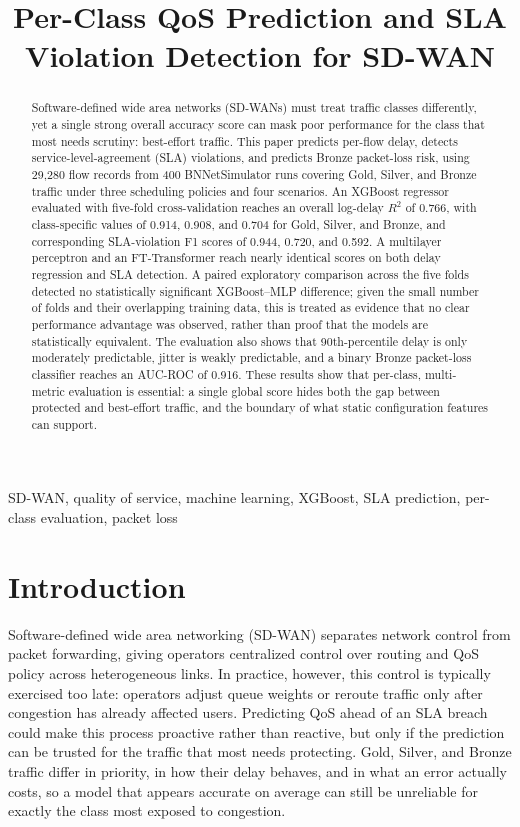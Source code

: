 \documentclass[conference]{IEEEtran}
\title{Per-Class QoS Prediction and SLA Violation Detection for SD-WAN}
\author{\IEEEauthorblockN{Radhika (Rishiv) Shitlani}
\IEEEauthorblockA{School of Computer Science\\
University of Galway, Galway, Ireland}}
\begin{document}
\maketitle

\begin{abstract}
Software-defined wide area networks (SD-WANs) must treat traffic classes differently, yet a single strong overall accuracy score can mask poor performance for the class that most needs scrutiny: best-effort traffic. This paper predicts per-flow delay, detects service-level-agreement (SLA) violations, and predicts Bronze packet-loss risk, using 29,280 flow records from 400 BNNetSimulator runs covering Gold, Silver, and Bronze traffic under three scheduling policies and four scenarios. An XGBoost regressor evaluated with five-fold cross-validation reaches an overall log-delay $R^2$ of 0.766, with class-specific values of 0.914, 0.908, and 0.704 for Gold, Silver, and Bronze, and corresponding SLA-violation F1 scores of 0.944, 0.720, and 0.592. A multilayer perceptron and an FT-Transformer reach nearly identical scores on both delay regression and SLA detection. A paired exploratory comparison across the five folds detected no statistically significant XGBoost--MLP difference; given the small number of folds and their overlapping training data, this is treated as evidence that no clear performance advantage was observed, rather than proof that the models are statistically equivalent. The evaluation also shows that 90th-percentile delay is only moderately predictable, jitter is weakly predictable, and a binary Bronze packet-loss classifier reaches an AUC-ROC of 0.916. These results show that per-class, multi-metric evaluation is essential: a single global score hides both the gap between protected and best-effort traffic, and the boundary of what static configuration features can support.
\end{abstract}

\begin{IEEEkeywords}
SD-WAN, quality of service, machine learning, XGBoost, SLA prediction, per-class evaluation, packet loss
\end{IEEEkeywords}

\section{Introduction}

Software-defined wide area networking (SD-WAN) separates network control from packet forwarding, giving operators centralized control over routing and QoS policy across heterogeneous links. In practice, however, this control is typically exercised too late: operators adjust queue weights or reroute traffic only after congestion has already affected users. Predicting QoS ahead of an SLA breach could make this process proactive rather than reactive, but only if the prediction can be trusted for the traffic that most needs protecting. Gold, Silver, and Bronze traffic differ in priority, in how their delay behaves, and in what an error actually costs, so a model that appears accurate on average can still be unreliable for exactly the class most exposed to congestion.
\end{document}
